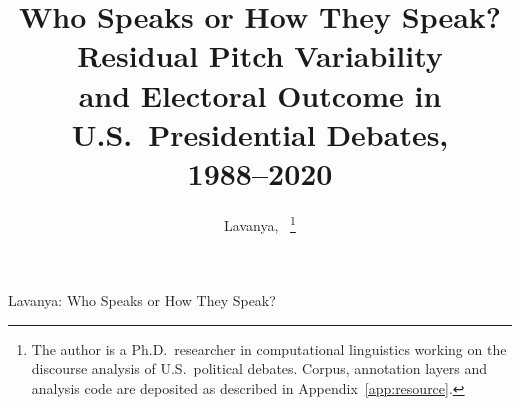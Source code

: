 \documentclass[journal]{IEEEtran}
\begin{document}
\title{Who Speaks or How They Speak? Residual Pitch Variability\\
       and Electoral Outcome in U.S.\ Presidential Debates,\\
       1988--2020}

\author{Lavanya,~%
\thanks{The author is a Ph.D.\ researcher in computational linguistics working
on the discourse analysis of U.S.\ political debates. Corpus, annotation
layers and analysis code are deposited as described in
Appendix~\ref{app:resource}.}}

%
{Lavanya: Who Speaks or How They Speak?}

\maketitle
\end{document}
